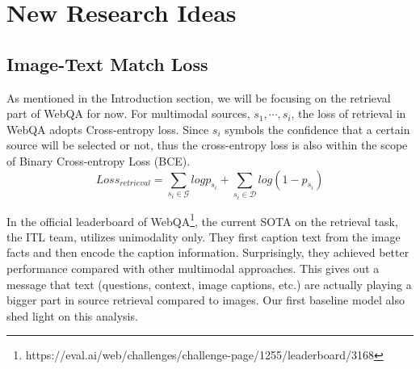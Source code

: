 \documentclass[nohyperref]{article}
\theoremstyle{plain}
\theoremstyle{definition}
\theoremstyle{remark}
\begin{document}
\section{New Research Ideas}

\subsection{Image-Text Match Loss}\label{sec:itm_research_idea}

As mentioned in the Introduction section, we will be focusing on the retrieval part of WebQA for now. For multimodal sources, $s_1, \cdots, s_i$, the loss of retrieval in WebQA adopts Cross-entropy loss. Since $s_i$ symbols the confidence that a certain source will be selected or not, thus the cross-entropy loss is also within the scope of Binary Cross-entropy Loss (BCE). 
\begin{equation}
Loss_{retrieval}=\sum_{s_i\in\mathcal{G}}logp_{s_i}+\sum_{s_i\in\mathcal{D}}log(1-p_{s_i})
\end{equation}

In the official leaderboard of WebQA\footnote[1]{https://eval.ai/web/challenges/challenge-page/1255/leaderboard/3168}, the current SOTA on the retrieval task, the ITL team, utilizes unimodality only. They first caption text from the image facts and then encode the caption information. Surprisingly, they achieved better performance compared with other multimodal approaches. This gives out a message that text (questions, context, image captions, etc.) are actually playing a bigger part in source retrieval compared to images. Our first baseline model also shed light on this analysis. 
\end{document}
